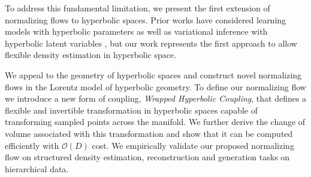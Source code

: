

To address this fundamental limitation, we present the first extension of normalizing flows to hyperbolic spaces. 
Prior works have considered learning models with hyperbolic parameters  \cite{liu2019hyperbolic,nickel2018learning} as well as variational inference with hyperbolic latent variables \cite{nagano2019wrapped,mathieu2019continuous}, but our work represents the first approach to allow flexible density estimation in hyperbolic space. 

We appeal to the geometry of hyperbolic spaces and construct novel normalizing flows in the Lorentz model of hyperbolic geometry. 
To define our normalizing flow we introduce a new form of coupling, {\em Wrapped Hyperbolic Coupling}, that defines a flexible and invertible transformation in hyperbolic spaces capable of transforming sampled points across the manifold. 
We further derive the change of volume associated with this transformation and show that it can be computed efficiently with $\mathcal{O}(D)$ cost. 
We empirically validate our proposed normalizing flow on structured density estimation, reconstruction and generation tasks on hierarchical data. 

